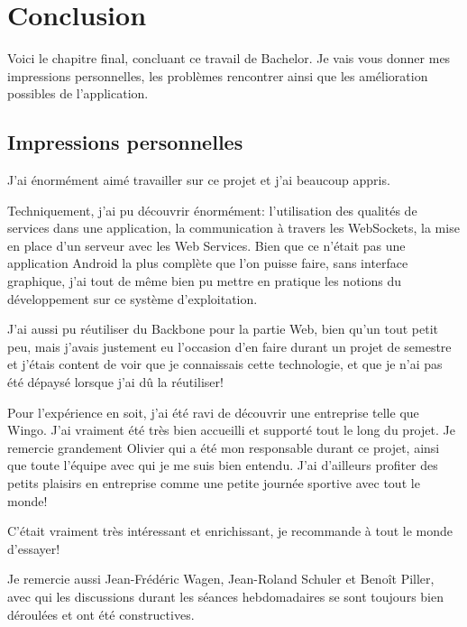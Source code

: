 
\chapter{Conclusion} %
\label{cha:conclusion}
Voici le chapitre final, concluant ce travail de Bachelor. Je vais vous donner mes impressions personnelles, les problèmes rencontrer ainsi que les amélioration possibles de l'application.


\section{Impressions personnelles} %
\label{sec:impression_personnelle}
J'ai énormément aimé travailler sur ce projet et j'ai beaucoup appris.

\medskip

Techniquement, j'ai pu découvrir énormément: l'utilisation des qualités de services dans une application, la communication à travers les WebSockets, la mise en place d'un serveur avec les Web Services. Bien que ce n'était pas une application Android la plus complète que l'on puisse faire, sans interface graphique, j'ai tout de même bien pu mettre en pratique les notions du développement sur ce système d'exploitation.

\medskip

J'ai aussi pu réutiliser du Backbone pour la partie Web, bien qu'un tout petit peu, mais j'avais justement eu l'occasion d'en faire durant un projet de semestre et j'étais content de voir que je connaissais cette technologie, et que je n'ai pas été dépaysé lorsque j'ai dû la réutiliser!

\medskip

Pour l'expérience en soit, j'ai été ravi de découvrir une entreprise telle que Wingo. J'ai vraiment été très bien accueilli et supporté tout le long du projet. Je remercie grandement Olivier qui a été mon responsable durant ce projet, ainsi que toute l'équipe avec qui je me suis bien entendu. J'ai d'ailleurs profiter des petits plaisirs en entreprise comme une petite journée sportive avec tout le monde!

\medskip

C'était vraiment très intéressant et enrichissant, je recommande à tout le monde d'essayer!

\medskip

Je remercie aussi Jean-Frédéric Wagen, Jean-Roland Schuler et Benoît Piller, avec qui les discussions durant les séances hebdomadaires se sont toujours bien déroulées et ont été constructives.

